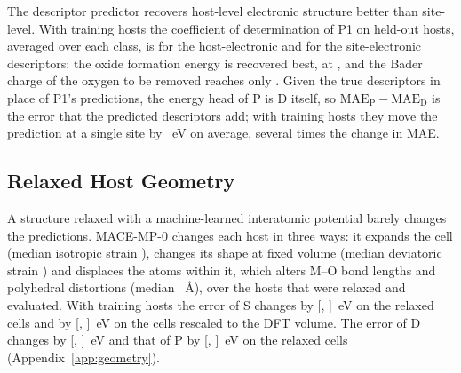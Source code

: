 The descriptor predictor recovers host-level electronic structure better than site-level. With \numCfgBudgetsMax{} training hosts the coefficient of determination of P1 on held-out hosts, averaged over each class, is \numNetStgSixHundredFiftyFourPOneRsqHost{} for the host-electronic and \numNetStgSixHundredFiftyFourPOneRsqSite{} for the site-electronic descriptors; the oxide formation energy is recovered best, at \numNetStgSixHundredFiftyFourPOneRsqFormation{}, and the Bader charge of the oxygen to be removed reaches only \numNetStgSixHundredFiftyFourPOneRsqBader{}. Given the true descriptors in place of P1's predictions, the energy head of P is D itself, so $\mathrm{MAE}_\mathrm{P} - \mathrm{MAE}_\mathrm{D}$ is the error that the predicted descriptors add; with \numCfgBudgetsMax{} training hosts they move the prediction at a single site by \numNetStgSixHundredFiftyFourSwapSite{}~eV on average, several times the change in MAE.

\subsection{Relaxed Host Geometry}
\label{sec:geometry}

A structure relaxed with a machine-learned interatomic potential barely changes the predictions. MACE-MP-0 changes each host in three ways: it expands the cell (median isotropic strain \numNetGeomIsotropicStrainMedian{}), changes its shape at fixed volume (median deviatoric strain \numNetGeomDeviatoricStrainMedian{}) and displaces the atoms within it, which alters M--O bond lengths and polyhedral distortions (median \numNetGeomInternalRmsdMedian{}~\AA{}), over the \numNetGeomEvaluatedHosts{} hosts that were relaxed and evaluated. With \numCfgBudgetsMax{} training hosts the error of S changes by \numNetGeomDeltaMaeSSixHundredFiftyFourRelaxed{} [\numNetGeomDeltaMaeSSixHundredFiftyFourRelaxedLo{}, \numNetGeomDeltaMaeSSixHundredFiftyFourRelaxedHi{}]~eV on the relaxed cells and by \numNetGeomDeltaMaeSSixHundredFiftyFourRescaled{} [\numNetGeomDeltaMaeSSixHundredFiftyFourRescaledLo{}, \numNetGeomDeltaMaeSSixHundredFiftyFourRescaledHi{}]~eV on the cells rescaled to the DFT volume. The error of D changes by \numNetGeomDeltaMaeDSixHundredFiftyFourRelaxed{} [\numNetGeomDeltaMaeDSixHundredFiftyFourRelaxedLo{}, \numNetGeomDeltaMaeDSixHundredFiftyFourRelaxedHi{}]~eV and that of P by \numNetGeomDeltaMaePSixHundredFiftyFourRelaxed{} [\numNetGeomDeltaMaePSixHundredFiftyFourRelaxedLo{}, \numNetGeomDeltaMaePSixHundredFiftyFourRelaxedHi{}]~eV on the relaxed cells (Appendix~\ref{app:geometry}).



